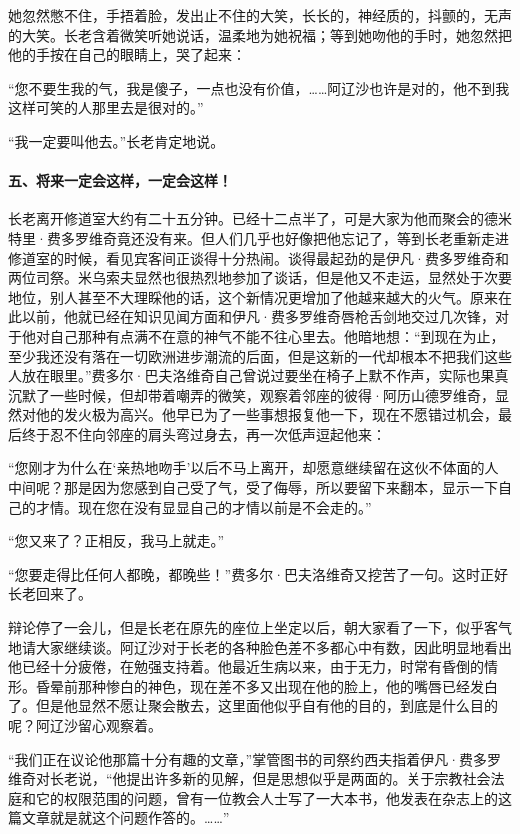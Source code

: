 \par 她忽然憋不住，手捂着脸，发出止不住的大笑，长长的，神经质的，抖颤的，无声的大笑。长老含着微笑听她说话，温柔地为她祝福；等到她吻他的手时，她忽然把他的手按在自己的眼睛上，哭了起来：
\par “您不要生我的气，我是傻子，一点也没有价值，……阿辽沙也许是对的，他不到我这样可笑的人那里去是很对的。”
\par “我一定要叫他去。”长老肯定地说。
\paragraph*{五、将来一定会这样，一定会这样！}
\par 长老离开修道室大约有二十五分钟。已经十二点半了，可是大家为他而聚会的德米特里·费多罗维奇竟还没有来。但人们几乎也好像把他忘记了，等到长老重新走进修道室的时候，看见宾客间正谈得十分热闹。谈得最起劲的是伊凡·费多罗维奇和两位司祭。米乌索夫显然也很热烈地参加了谈话，但是他又不走运，显然处于次要地位，别人甚至不大理睬他的话，这个新情况更增加了他越来越大的火气。原来在此以前，他就已经在知识见闻方面和伊凡·费多罗维奇唇枪舌剑地交过几次锋，对于他对自己那种有点满不在意的神气不能不往心里去。他暗地想：“到现在为止，至少我还没有落在一切欧洲进步潮流的后面，但是这新的一代却根本不把我们这些人放在眼里。”费多尔·巴夫洛维奇自己曾说过要坐在椅子上默不作声，实际也果真沉默了一些时候，但却带着嘲弄的微笑，观察着邻座的彼得·阿历山德罗维奇，显然对他的发火极为高兴。他早已为了一些事想报复他一下，现在不愿错过机会，最后终于忍不住向邻座的肩头弯过身去，再一次低声逗起他来：
\par “您刚才为什么在‘亲热地吻手’以后不马上离开，却愿意继续留在这伙不体面的人中间呢？那是因为您感到自己受了气，受了侮辱，所以要留下来翻本，显示一下自己的才情。现在您在没有显显自己的才情以前是不会走的。”
\par “您又来了？正相反，我马上就走。”
\par “您要走得比任何人都晚，都晚些！”费多尔·巴夫洛维奇又挖苦了一句。这时正好长老回来了。
\par 辩论停了一会儿，但是长老在原先的座位上坐定以后，朝大家看了一下，似乎客气地请大家继续谈。阿辽沙对于长老的各种脸色差不多都心中有数，因此明显地看出他已经十分疲倦，在勉强支持着。他最近生病以来，由于无力，时常有昏倒的情形。昏晕前那种惨白的神色，现在差不多又出现在他的脸上，他的嘴唇已经发白了。但是他显然不愿让聚会散去，这里面他似乎自有他的目的，到底是什么目的呢？阿辽沙留心观察着。
\par “我们正在议论他那篇十分有趣的文章，”掌管图书的司祭约西夫指着伊凡·费多罗维奇对长老说，“他提出许多新的见解，但是思想似乎是两面的。关于宗教社会法庭和它的权限范围的问题，曾有一位教会人士写了一大本书，他发表在杂志上的这篇文章就是就这个问题作答的。……”
